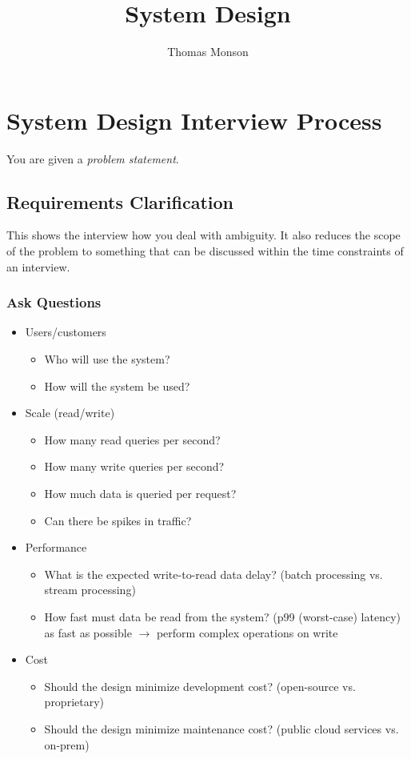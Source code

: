 \documentclass[12pt, titlepage]{article}
\title{System Design}
\author{Thomas Monson}
\date{}
\begin{document}
\maketitle

\tableofcontents
\newpage

\section{System Design Interview Process}

You are given a \textit{problem statement}.

\subsection{Requirements Clarification}

This shows the interview how you deal with ambiguity. It also reduces the scope of the problem to something that can be discussed within the time constraints of an interview.

\subsubsection{Ask Questions}

\begin{itemize}
  \item Users/customers
    \begin{itemize}
      \item Who will use the system?
      \item How will the system be used?
    \end{itemize}
  \item Scale (read/write)
    \begin{itemize}
      \item How many read queries per second?
      \item How many write queries per second?
      \item How much data is queried per request?
      \item Can there be spikes in traffic?
    \end{itemize}
  \item Performance
    \begin{itemize}
      \item What is the expected write-to-read data delay? (batch processing vs. stream processing)
      \item How fast must data be read from the system? (p99 (worst-case) latency) \medskip \\
        \phantom{MM}as fast as possible $\rightarrow$ perform complex operations on write
    \end{itemize}
  \item Cost
    \begin{itemize}
      \item Should the design minimize development cost? (open-source vs. proprietary)
      \item Should the design minimize maintenance cost? (public cloud services vs. on-prem)
    \end{itemize}
\end{itemize}
\end{document}
